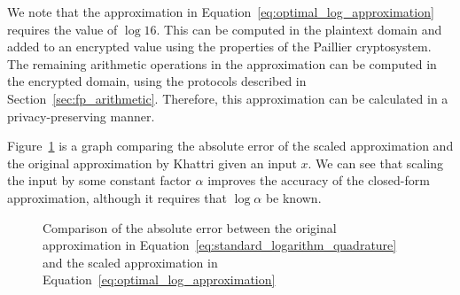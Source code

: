 We note that the approximation in Equation~\ref{eq:optimal_log_approximation} requires the value of $\log{16}$. This can be computed in the plaintext domain and added to an encrypted value using the properties of the Paillier cryptosystem. The remaining arithmetic operations in the approximation can be computed in the encrypted domain, using the protocols described in Section~\ref{sec:fp_arithmetic}. Therefore, this approximation can be calculated in a privacy-preserving manner.

Figure~\ref{fig:log_error_comparison} is a graph comparing the absolute error of the scaled approximation and the original approximation by Khattri given an input $x$. We can see that scaling the input by some constant factor $\alpha$ improves the accuracy of the closed-form approximation, although it requires that $\log \alpha$ be known.

\begin{figure}[ht]
	\centering
	\caption{Comparison of the absolute error between the original approximation in Equation~\ref{eq:standard_logarithm_quadrature} and the scaled approximation in Equation~\ref{eq:optimal_log_approximation}}
	\label{fig:log_error_comparison}
\end{figure}

